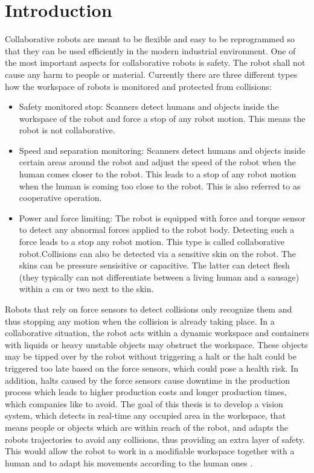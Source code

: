 \chapter{Introduction}
\label{chap:introduction}
Collaborative robots are meant to be flexible and easy to be reprogrammed so that they can be used efficiently in the modern industrial environment. One of the most important aspects for collaborative robots is safety. The robot shall not cause any harm to people or material. 
Currently there are three different types \cite{robotiq}  how the workspace of robots is monitored and protected from collisions:

\begin{itemize}
	\item Safety monitored stop: Scanners detect humans and objects inside the workspace of the robot and force a stop of any robot motion. This means the robot is not collaborative.
	\item Speed and separation monitoring: Scanners detect humans and objects inside certain areas around the robot and adjust the speed of the robot when the human comes closer to the robot. This leads to a stop of any robot motion when the human is coming too close to the robot. This is also referred to as cooperative operation.
	\item Power and force limiting: The robot is equipped with force and torque sensor to detect any abnormal forces applied to the robot body. Detecting such a force leads to a stop any robot motion. This type is called collaborative robot.Collisions can also be detected via a  sensitive skin on the robot. The skins can be pressure sensisitive or capacitive. The latter can detect flesh (they typically can not differentiate between a living human and a sausage) within a cm or two next to the skin. 
\end{itemize}
	
Robots that rely on force sensors to detect collisions only recognize them and thus stopping any motion when the collision is already taking place. In a collaborative situation, the robot acts within a dynamic workspace and containers with liquids or heavy unstable objects may obstruct the workspace. These objects may be tipped over by the robot without triggering a halt or the halt could be triggered too late based on the force sensors, which could pose a health risk.
In addition, halts caused by the force sensors cause downtime in the production process which leads to higher production costs and longer production times, which companies like to avoid.
The goal of this thesis is to develop a vision system, which detects in real-time any occupied area in the workspace, that means people or objects which are within reach of the robot, and adapts the robots trajectories to avoid any collisions, thus providing an extra layer of safety. This would allow the robot to work in a modifiable workspace together with a human and to adapt his movements according to the human ones \cite{work_desc}. 


